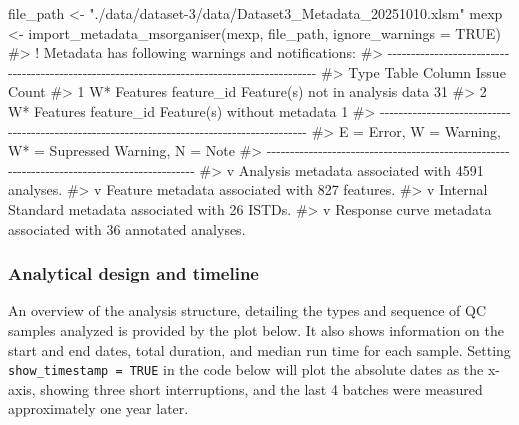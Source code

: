 \documentclass[
  letterpaper,
  DIV=11,
  numbers=noendperiod]{scrartcl}
\newenvironment{Shaded}{\begin{snugshade}}{\end{snugshade}}
\newcommand{\AttributeTok}[1]{\textcolor[rgb]{0.40,0.45,0.13}{#1}}
\newcommand{\CommentTok}[1]{\textcolor[rgb]{0.37,0.37,0.37}{#1}}
\newcommand{\ConstantTok}[1]{\textcolor[rgb]{0.56,0.35,0.01}{#1}}
\newcommand{\FunctionTok}[1]{\textcolor[rgb]{0.28,0.35,0.67}{#1}}
\newcommand{\NormalTok}[1]{\textcolor[rgb]{0.00,0.23,0.31}{#1}}
\newcommand{\OtherTok}[1]{\textcolor[rgb]{0.00,0.23,0.31}{#1}}
\newcommand{\StringTok}[1]{\textcolor[rgb]{0.13,0.47,0.30}{#1}}
\begin{document}
\begin{Shaded}
\begin{Highlighting}[]
\NormalTok{file\_path }\OtherTok{\textless{}{-}} \StringTok{"./data/dataset{-}3/data/Dataset3\_Metadata\_20251010.xlsm"}
\NormalTok{mexp }\OtherTok{\textless{}{-}} \FunctionTok{import\_metadata\_msorganiser}\NormalTok{(mexp, file\_path, }\AttributeTok{ignore\_warnings =} \ConstantTok{TRUE}\NormalTok{)}
\CommentTok{\#\textgreater{} ! Metadata has following warnings and notifications:}
\CommentTok{\#\textgreater{} {-}{-}{-}{-}{-}{-}{-}{-}{-}{-}{-}{-}{-}{-}{-}{-}{-}{-}{-}{-}{-}{-}{-}{-}{-}{-}{-}{-}{-}{-}{-}{-}{-}{-}{-}{-}{-}{-}{-}{-}{-}{-}{-}{-}{-}{-}{-}{-}{-}{-}{-}{-}{-}{-}{-}{-}{-}{-}{-}{-}{-}{-}{-}{-}{-}{-}{-}{-}{-}{-}{-}{-}{-}{-}{-}{-}{-}{-}{-}{-}{-}{-}{-}{-}{-}{-}{-}{-}{-}{-}{-}{-}}
\CommentTok{\#\textgreater{}   Type Table    Column     Issue                           Count}
\CommentTok{\#\textgreater{} 1 W*   Features feature\_id Feature(s) not in analysis data    31}
\CommentTok{\#\textgreater{} 2 W*   Features feature\_id Feature(s) without metadata         1}
\CommentTok{\#\textgreater{} {-}{-}{-}{-}{-}{-}{-}{-}{-}{-}{-}{-}{-}{-}{-}{-}{-}{-}{-}{-}{-}{-}{-}{-}{-}{-}{-}{-}{-}{-}{-}{-}{-}{-}{-}{-}{-}{-}{-}{-}{-}{-}{-}{-}{-}{-}{-}{-}{-}{-}{-}{-}{-}{-}{-}{-}{-}{-}{-}{-}{-}{-}{-}{-}{-}{-}{-}{-}{-}{-}{-}{-}{-}{-}{-}{-}{-}{-}{-}{-}{-}{-}{-}{-}{-}{-}{-}{-}{-}{-}{-}{-}}
\CommentTok{\#\textgreater{} E = Error, W = Warning, W* = Supressed Warning, N = Note}
\CommentTok{\#\textgreater{} {-}{-}{-}{-}{-}{-}{-}{-}{-}{-}{-}{-}{-}{-}{-}{-}{-}{-}{-}{-}{-}{-}{-}{-}{-}{-}{-}{-}{-}{-}{-}{-}{-}{-}{-}{-}{-}{-}{-}{-}{-}{-}{-}{-}{-}{-}{-}{-}{-}{-}{-}{-}{-}{-}{-}{-}{-}{-}{-}{-}{-}{-}{-}{-}{-}{-}{-}{-}{-}{-}{-}{-}{-}{-}{-}{-}{-}{-}{-}{-}{-}{-}{-}{-}{-}{-}{-}{-}{-}{-}{-}{-}}
\CommentTok{\#\textgreater{} v Analysis metadata associated with 4591 analyses.}
\CommentTok{\#\textgreater{} v Feature metadata associated with 827 features.}
\CommentTok{\#\textgreater{} v Internal Standard metadata associated with 26 ISTDs.}
\CommentTok{\#\textgreater{} v Response curve metadata associated with 36 annotated analyses.}
\end{Highlighting}
\end{Shaded}

\subsubsection{Analytical design and
timeline}\label{analytical-design-and-timeline}

An overview of the analysis structure, detailing the types and sequence
of QC samples analyzed is provided by the plot below. It also shows
information on the start and end dates, total duration, and median run
time for each sample. Setting \texttt{show\_timestamp\ =\ TRUE} in the
code below will plot the absolute dates as the x-axis, showing three
short interruptions, and the last 4 batches were measured approximately
one year later.
\end{document}
